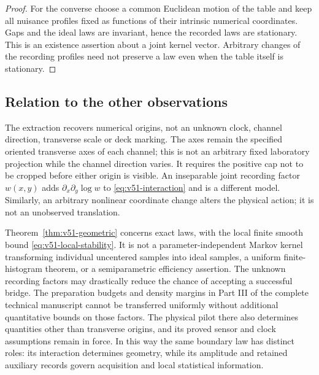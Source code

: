 \begin{proof}
For the converse choose a common Euclidean motion of the table and keep
all nuisance profiles fixed as functions of their intrinsic numerical
coordinates.  Gaps and the ideal laws are invariant, hence the recorded
laws are stationary.  This is an existence assertion about a joint kernel
vector.  Arbitrary changes of the recording profiles need not preserve
a law even when the table itself is stationary.
\end{proof}

\subsection{Relation to the other observations}

The extraction recovers numerical origins, not an unknown clock, channel
direction, transverse scale or deck marking.  The axes remain the specified
oriented transverse axes of each channel; this is not an arbitrary fixed
laboratory projection while the channel direction varies.  It requires the positive cap
not to be cropped before either origin is visible.  An inseparable joint
recording factor $w(x,y)$ adds $\partial_x\partial_y\log w$ to
\eqref{eq:v51-interaction} and is a different model.  Similarly, an arbitrary
nonlinear coordinate change alters the physical action; it is not an
unobserved translation.

Theorem~\ref{thm:v51-geometric} concerns exact laws, with the local finite
smooth bound \eqref{eq:v51-local-stability}.  It is not a parameter-independent
Markov kernel transforming individual uncentered samples into ideal samples,
a uniform finite-histogram theorem, or a semiparametric efficiency assertion.
The unknown recording factors may drastically reduce the chance of accepting
a successful bridge.  The preparation budgets and density margins in
Part III of the complete technical manuscript cannot be transferred uniformly without additional quantitative
bounds on those factors.  The physical pilot there also determines quantities
other than transverse origins, and its proved sensor and clock assumptions
remain in force.  In this way the same boundary law has distinct roles:
its interaction determines geometry, while its amplitude and retained
auxiliary records govern acquisition and local statistical information.
